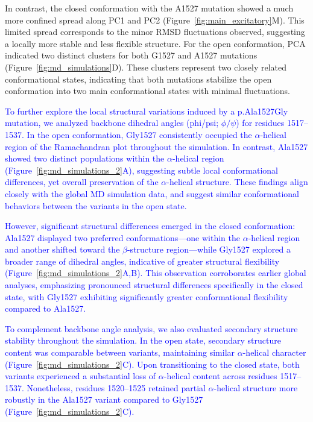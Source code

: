 In contrast, the closed conformation with the A1527 mutation showed a much more confined spread along PC1 and PC2 (Figure~\ref{fig:main_excitatory}M). This limited spread corresponds to the minor RMSD fluctuations observed, suggesting a locally more stable and less flexible structure. 
For the open conformation, PCA indicated two distinct clusters for both G1527 and A1527 mutations (Figure~\ref{fig:md_simulations}D). These clusters represent two closely related conformational states, indicating that both mutations stabilize the open conformation into two main conformational states with minimal fluctuations. 

\newcommand{\quoteM}{\textcolor{blue}{To further explore the local structural variations induced by a p.Ala1527Gly mutation, we analyzed backbone dihedral angles (phi/psi; $\phi/\psi$) for residues 1517–1537. In the open conformation, Gly1527 consistently occupied the $\alpha$-helical region of the Ramachandran plot throughout the simulation. In contrast, Ala1527 showed two distinct populations within the $\alpha$-helical region (Figure~\ref{fig:md_simulations_2}A), suggesting subtle local conformational differences, yet overall preservation of the $\alpha$-helical structure. These findings align closely with the global MD simulation data, and suggest similar conformational behaviors between the variants in the open state. \label{quoteM-label}}}

\quoteM

\newcommand{\quoteN}{\textcolor{blue}{However, significant structural differences emerged in the closed conformation: Ala1527 displayed two preferred conformations—one within the $\alpha$-helical region and another shifted toward the $\beta$-structure region—while Gly1527 explored a broader range of dihedral angles, indicative of greater structural flexibility (Figure~\ref{fig:md_simulations_2}A,B). This observation corroborates earlier global analyses, emphasizing pronounced structural differences specifically in the closed state, with Gly1527 exhibiting significantly greater conformational flexibility compared to Ala1527.}}

\quoteN

\newcommand{\quoteO}{\textcolor{blue}{To complement backbone angle analysis, we also evaluated secondary structure stability throughout the simulation. In the open state, secondary structure content was comparable between variants, maintaining similar $\alpha$-helical character (Figure~\ref{fig:md_simulations_2}C). Upon transitioning to the closed state, both variants experienced a substantial loss of $\alpha$-helical content across residues 1517–1537. Nonetheless, residues 1520–1525 retained partial $\alpha$-helical structure more robustly in the Ala1527 variant compared to Gly1527 (Figure~\ref{fig:md_simulations_2}C).}}

\quoteO